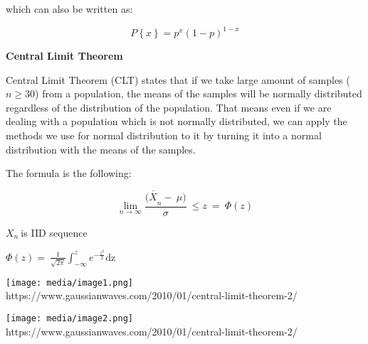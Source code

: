 \documentclass[
]{article}
\begin{document}
which can also be written as:

\[P\left\{ x \right\} = p^{x}{(1 - p)}^{1 - x}\]

\textbf{Central Limit Theorem}

Central Limit Theorem (CLT) states that if we take large amount of
samples (\(n \geq 30\)) from a population, the means of the samples will
be normally distributed regardless of the distribution of the
population. That means even if we are dealing with a population which is
not normally distributed, we can apply the methods we use for normal
distribution to it by turning it into a normal distribution with the
means of the samples.

The formula is the following:

\[\lim_{n \rightarrow \infty}\frac{\overline{{(X}_{n}} - \ \mu)}{\sigma}\  \leq z\  = \ \Phi(z)\]

\(X_{n}\ \)is IID sequence

\(\Phi\left( z \right) = \ \frac{1}{\sqrt{2\pi}}\int_{- \infty}^{z}e^{- \frac{z^{2}}{2}}\text{dz}\)

\texttt{[image: media/image1.png]}\\
https://www.gaussianwaves.com/2010/01/central-limit-theorem-2/

\texttt{[image: media/image2.png]}\\
https://www.gaussianwaves.com/2010/01/central-limit-theorem-2/
\end{document}
